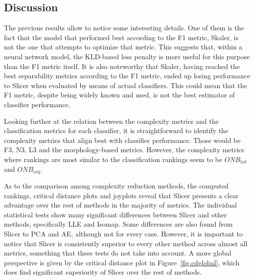 \documentclass[
	fontsize=11pt, %
	twoside=false, %
	open=any, %
	secnumdepth=1, %
]{kaobook}
\begin{document}
\subsection{Discussion}
The previous results allow to notice some interesting details. One of them is the fact that the model that performed best according to the F1 metric, Skaler, is not the one that attempts to optimize that metric. This suggests that, within a neural network model, the KLD-based loss penalty is more useful for this purpose than the F1 metric itself. It is also noteworthy that Skaler, having reached the best separability metrics according to the F1 metric, ended up losing performance to Slicer when evaluated by means of actual classifiers. This could mean that the F1 metric, despite being widely known and used, is not the best estimator of classifier performance.

Looking further at the relation between the complexity metrics and the classification metrics for each classifier, it is straightforward to identify the complexity metrics that align best with classifier performance. Those would be F3, N3, L3 and the morphology-based metrics. However, the complexity metrics where rankings are most similar to the classification rankings seem to be $\textit{ONB}_{\text{tot}}$ and $\textit{ONB}_{\text{avg}}$. %

As to the comparison among complexity reduction methods, the computed rankings, critical distance plots and joyplots reveal that Slicer presents a clear advantage over the rest of methods in the majority of metrics. The individual statistical tests show many significant differences between Slicer and other methods, specifically LLE and Isomap. Some differences are also found from Slicer to PCA and AE, although not for every case. However, it is important to notice that Slicer is consistently superior to every other method across almost all metrics, something that these tests do not take into account. A more global perspective is given by the critical distance plot in Figure~\ref{fig.cdglobal}, which does find significant superiority of Slicer over the rest of methods.
\end{document}
